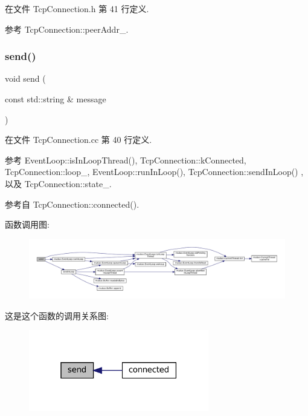 在文件 Tcp\+Connection.\+h 第 41 行定义.



参考 Tcp\+Connection\+::peer\+Addr\+\_\+.

\mbox{\label{classmuduo_1_1TcpConnection_a4d274fdc2a242187da42dcd82cd593ec}} 
\subsubsection{\texorpdfstring{send()}{send()}}
{\footnotesize\ttfamily void send (\begin{DoxyParamCaption}\item[{const std\+::string \&}]{message }\end{DoxyParamCaption})}



在文件 Tcp\+Connection.\+cc 第 40 行定义.



参考 Event\+Loop\+::is\+In\+Loop\+Thread(), Tcp\+Connection\+::k\+Connected, Tcp\+Connection\+::loop\+\_\+, Event\+Loop\+::run\+In\+Loop(), Tcp\+Connection\+::send\+In\+Loop() , 以及 Tcp\+Connection\+::state\+\_\+.



参考自 Tcp\+Connection\+::connected().

函数调用图\+:
\nopagebreak
\begin{figure}[H]
\begin{center}
\leavevmode
\includegraphics[width=350pt]{classmuduo_1_1TcpConnection_a4d274fdc2a242187da42dcd82cd593ec_cgraph}
\end{center}
\end{figure}
这是这个函数的调用关系图\+:
\nopagebreak
\begin{figure}[H]
\begin{center}
\leavevmode
\includegraphics[width=223pt]{classmuduo_1_1TcpConnection_a4d274fdc2a242187da42dcd82cd593ec_icgraph}
\end{center}
\end{figure}
\mbox{\label{classmuduo_1_1TcpConnection_a016986a5f7c6f0d415e25b4b6bdbf481}} 
